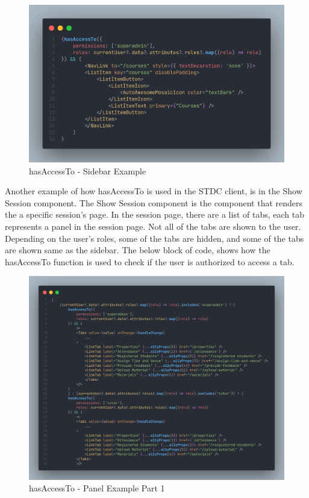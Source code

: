 \begin{justify}
        \begin{figure}[H]
            \centerline{\includegraphics[width=150mm,scale=1]{figures/implementation_and_testing/implementation/frontend/hasAccessTo-Sidebar.png}}
            \caption{hasAccessTo - Sidebar Example}
        \end{figure}

        \vspace{0.25cm}
        \newendline Another example of how hasAccessTo is used in the STDC client, is in the Show Session component. The Show Session component is the component that renders the a specific session's page. In the session page, there are a list of tabs, each tab represents a panel in the session page. Not all of the tabs are shown to the user. Depending on the user's roles, some of the tabs are hidden, and some of the tabs are shown same as the sidebar. The below block of code, shows how the hasAccessTo function is used to check if the user is authorized to access a tab.

        \begin{figure}[H]
            \centerline{\includegraphics[width=150mm,scale=1]{figures/implementation_and_testing/implementation/frontend/hasAccessTo-Panel-1.png}}
            \caption{hasAccessTo - Panel Example Part 1}
        \end{figure}


\end{justify}
